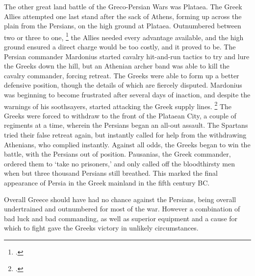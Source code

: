 \documentclass[twoside, a4paper, 12pt]{article}
\begin{document}
The other great land battle of the
Greco-Persian Wars was Plataea. The Greek Allies attempted one last stand after
the sack of Athens, forming up across the plain from the Persians, on the
high ground at Plataea. Outnumbered between two or three to one,
\footcite[Book 9.31-2]{herodotus_1920}
the Allies needed every advantage available, and the high ground ensured a
direct charge would be too costly, and it proved to be. The Persian commander
Mardonius started cavalry hit-and-run tactics to try and lure the Greeks down the
hill, but an Athenian archer band was able to kill the cavalry commander,
forcing retreat.\footnotemark
The Greeks were able to form up a better defensive
position, though the details of which are fiercely disputed.\footnotemark[\value{footnote}]
Mardonius was beginning to become frustrated after several days of inaction,
and despite the warnings of his soothsayers,
started attacking the Greek supply lines. \footcite[\emph{Arist.}15]{plutarch_1920}
The Greeks were forced to withdraw to the front of the Plataean City, a couple of
regiments at a time, wherein the Persians began an all-out assault. The Spartans
tried their false retreat again, but instantly called for help from the withdrawing
Athenians, who complied instantly. \footnotemark
Against all odds, the Greeks began to win the battle, with the Persians out
of position.
Pausanias, the Greek commander, ordered them to `take no prisoners,' and only
called off the bloodthirsty men when but three thousand Persians still
breathed.\footnotemark[\value{footnote}]
This marked the final appearance of Persia in the Greek mainland in the
fifth century BC.
\par\vspace{1em}

Overall Greece should have had no chance against the Persians, being overall
undertrained and outnumbered for most of the war. However a combination
of bad luck and bad commanding, as well as superior equipment and a cause
for which to fight gave the Greeks victory in unlikely circumstances.

\newpage

\listoffigures
\printbibliography
\end{document}
